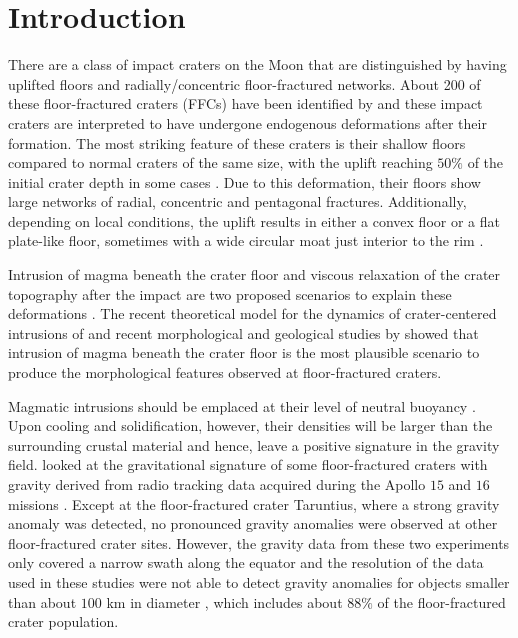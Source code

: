 \section{Introduction}
\label{sec:introduction}
  
There are a class of impact craters on the Moon that are distinguished
by  having  uplifted  floors and  radially/concentric  floor-fractured
networks.  About 200 of these floor-fractured craters (FFCs) have been
identified  by \citet{Schultz:1976kt}  and  these  impact craters  are
interpreted  to have  undergone  endogenous  deformations after  their
formation.   The  most striking  feature  of  these craters  is  their
shallow floors compared  to normal craters of the same  size, with the
uplift  reaching $50\%$  of the  initial  crater depth  in some  cases
\citep{Schultz:1976kt}.  Due  to this  deformation, their  floors show
large  networks  of  radial,   concentric  and  pentagonal  fractures.
Additionally,  depending on  local conditions,  the uplift  results in
either a  convex floor or  a flat  plate-like floor, sometimes  with a
wide     circular     moat     just    interior     to     the     rim
\citep{Schultz:1976kt,Jozwiak:2012dq}.

Intrusion of magma beneath the  crater floor and viscous relaxation of
the crater topography  after the impact are two  proposed scenarios to
explain                       these                       deformations
\citep{Schultz:1976kt,Hall:1981kl,Wichman:1995ju,Dombard:2001gs}.  The
recent  theoretical   model  for   the  dynamics   of  crater-centered
intrusions  of  \citet{Thorey:2014cv}  and  recent  morphological  and
geological studies by \citet{Jozwiak:2012dq}  showed that intrusion of
magma  beneath the  crater floor  is  the most  plausible scenario  to
produce  the   morphological  features  observed   at  floor-fractured
craters.
  
Magmatic  intrusions should  be  emplaced at  their  level of  neutral
buoyancy   \citep{Walker:1989jq,Taisne:2009kj,Wichman:1995ju}.    Upon
cooling and  solidification, however,  their densities will  be larger
than  the surrounding  crustal material  and hence,  leave a  positive
signature in the gravity  field.  \citet{Schultz:1976kt} looked at the
gravitational signature  of some floor-fractured craters  with gravity
derived from radio  tracking data acquired during the  Apollo $15$ and
$16$  missions \citep{Sjogren:1972kk,Sjogren:1974ij}.   Except at  the
floor-fractured crater  Taruntius, where a strong  gravity anomaly was
detected,  no  pronounced gravity  anomalies  were  observed at  other
floor-fractured crater  sites.  However,  the gravity data  from these
two experiments only covered a narrow  swath along the equator and the
resolution of the  data used in these studies were  not able to detect
gravity anomalies for objects smaller  than about $100$ km in diameter
\citep{Schultz:1976kt,Sjogren:1974ij}, which includes  about $88\%$ of
the floor-fractured crater population.


